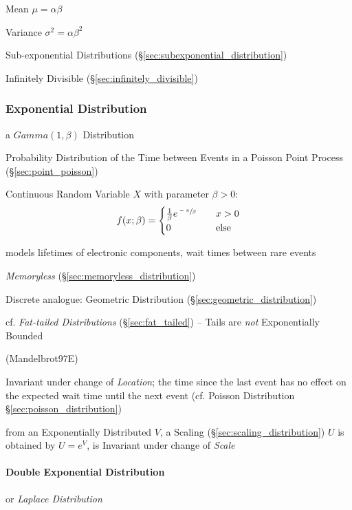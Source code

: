Mean $\mu = \alpha \beta$

Variance $\sigma^2 = \alpha \beta^2$

Sub-exponential Distributions (\S\ref{sec:subexponential_distribution})

Infinitely Divisible (\S\ref{sec:infinitely_divisible})



\subsubsection{Exponential Distribution}\label{sec:exponential_distribution}

a $Gamma(1, \beta)$ Distribution

Probability Distribution of the Time between Events in a Poisson Point Process
(\S\ref{sec:point_poisson})

Continuous Random Variable $X$ with parameter $\beta > 0$:
\[
  f(x; \beta) =
  \begin{cases}
  \frac{1}{\beta} e^{\sfrac{-x}{\beta}}     & \quad x > 0 \\
  0     & \quad\text{else} \\
  \end{cases}
\]

models lifetimes of electronic components, wait times between rare events

\emph{Memoryless} (\S\ref{sec:memoryless_distribution})

\fist Discrete analogue: Geometric Distribution
(\S\ref{sec:geometric_distribution})

cf. \emph{Fat-tailed Distributions} (\S\ref{sec:fat_tailed}) -- Tails are
\emph{not} Exponentially Bounded

(Mandelbrot97E)

Invariant under change of \emph{Location}; the time since the last event has no
effect on the expected wait time until the next event (cf. Poisson Distribution
\S\ref{sec:poisson_distribution})

from an Exponentially Distributed $V$, a Scaling
(\S\ref{sec:scaling_distribution}) $U$ is obtained by $U = e^V$, is Invariant
under change of \emph{Scale}



\paragraph{Double Exponential Distribution}\label{sec:double_exponential}\hfill

or \emph{Laplace Distribution}



